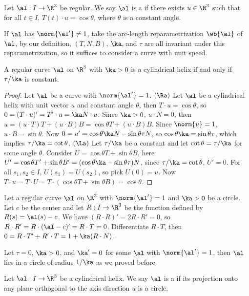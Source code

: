 \documentclass[10pt]{article}
\begin{document}
\begin{definition}
    Let $\al:I\to{\R}^{3}$ be regular. We say $\al$ is a  if there exists $u\in{\R}^{3}$ such that for all $t\in I$, $T(t)\cdot u=\cos\theta$, where $\theta$ is a constant angle.
\end{definition}
\par
If $\al$ has $\norm{\al'}\ne 1$, take the arc-length reparametrization $\wb{\al}$ of $\al$, by our definition, $(T,N,B)$, $\ka$, and $\tau$ are all invariant under this reparametrization, so it suffices to consider a curve with unit speed.
\begin{proposition}
    A regular curve $\al$ on ${\R}^{3}$ with $\ka>0$ is a cylindrical helix if and only if $\tau/\ka$ is constant.
\end{proposition}
\begin{proof}
    Let $\al$ be a curve with $\norm{\al'}=1$. $(\Ra)$ Let $\al$ be a cylindrical helix with unit vector $u$ and constant angle $\theta$, then $T\cdot u=\cos\theta$, so $0=(T\cdot u)'=T'\cdot u=\ka N\cdot u$. Since $\ka>0$, $u\cdot N=0$, then $u=(u\cdot T)T+(u\cdot B)B=\cos\theta T+(u\cdot B)B$. Since $\norm{u}=1$, $u\cdot B=\sin\theta$. Now $0=u'=\cos\theta\ka N-\sin\theta\tau N$, so $\cos\theta\ka=\sin\theta\tau$, which implies $\tau/\ka=\cot\theta$. $(\La)$ Let $\tau/\ka$ be a constant and let $\cot\theta=\tau/\ka$ for some angle $\theta$. Consider $U=\cos\theta T+\sin\theta B$, here $U'=\cos\theta T'+\sin\theta B'=(\cos\theta\ka-\sin\theta\tau)N$, since $\tau/\ka=\cot\theta$, $U'=0$. For all ${s}_{1},{s}_{2}\in I$, $U({s}_{1})=U({s}_{2})$, so pick $U(0)=u$. Now $T\cdot u=T\cdot U=T\cdot(\cos\theta T+\sin\theta B)=\cos\theta$.
\end{proof}
\par
Let a regular curve $\al$ on ${\R}^{3}$ with $\norm{\al'}=1$ and $\ka>0$ be a circle. Let $c$ be the center and let $R:I\to{\R}^{3}$ be the function defined by $R(s)=\al(s)-c$. We have $(R\cdot R)'=2R\cdot R'=0$, so $R\cdot R'=R\cdot(\al-c)'=R\cdot T=0$. Differentiate $R\cdot T$, then $0=R\cdot T'+R'\cdot T=1+\ka(R\cdot N)$.

Let $\tau=0$, $\ka>0$, and $\ka'=0$ for some $\al$ with $\norm{\al'}=1$, then $\al$ lies in a circle of radius $1/\ka$ as we proved before.
\begin{definition}
    Let $\al:I\to{\R}^{3}$ be a cylindrical helix. We say $\al$ is a  if its projection onto any plane orthogonal to the axis direction $u$ is a circle.
\end{definition}
\par
\end{document}
